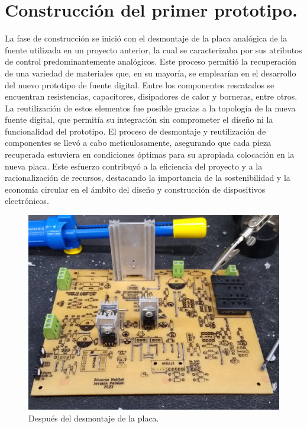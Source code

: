 \section{Construcción del primer prototipo.}
La fase de construcción se inició con el desmontaje de la placa analógica de la fuente utilizada en un proyecto anterior, la cual se caracterizaba por sus atributos de control predominantemente analógicos. Este proceso permitió la recuperación de una variedad de materiales que, en su mayoría, se emplearían en el desarrollo del nuevo prototipo de fuente digital. Entre los componentes rescatados se encuentran resistencias, capacitores, disipadores de calor y borneras, entre otros. La reutilización de estos elementos fue posible gracias a la topología de la nueva fuente digital, que permitía su integración sin comprometer el diseño ni la funcionalidad del prototipo. 
El proceso de desmontaje y reutilización de componentes se llevó a cabo meticulosamente, asegurando que cada pieza recuperada estuviera en condiciones óptimas para su apropiada colocación en la nueva placa. Este esfuerzo contribuyó a la eficiencia del proyecto y a la racionalización de recursos, destacando la importancia de la sostenibilidad y la economía circular en el ámbito del diseño y construcción de dispositivos electrónicos.

\begin{figure}[H]
    \centering
    \includegraphics[scale=0.1]{./imagenes/fotos/desmontada.jpg}
    \caption{Después del desmontaje de la placa.}
    \label{F:desmontaje_de_la_placa}
\end{figure}

